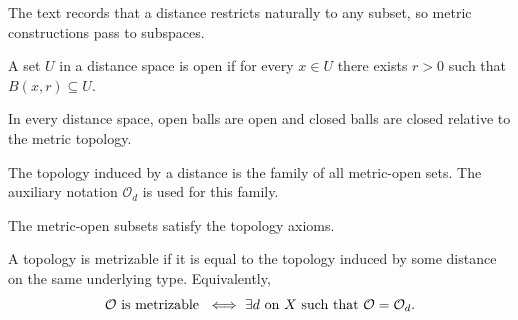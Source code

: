 \begin{remark}\label{rem:distance-restriction-1-13}
\leanok
The text records that a distance restricts naturally to any subset, so metric constructions pass to subspaces.
\end{remark}

\begin{definition}\label{def:is-open-distance-1-15}
\leanok
A set $U$ in a distance space is open if for every $x\in U$ there exists $r>0$ such that $B(x,r)\subseteq U$.
\end{definition}

\begin{proposition}\label{prop:balls-open-closed-1-16}
\leanok
In every distance space, open balls are open and closed balls are closed relative to the metric topology.
\end{proposition}

\begin{definition}\label{def:induced-topology-1-17}
\leanok
The topology induced by a distance is the family of all metric-open sets.
The auxiliary notation $\mathcal O_d$ is used for this family.
\end{definition}

\begin{proposition}\label{prop:induced-topology-is-topology-1-17}
\leanok
The metric-open subsets satisfy the topology axioms.
\end{proposition}

\begin{definition}\label{def:metrizable-1-18}
\leanok
A topology is metrizable if it is equal to the topology induced by some distance on the same underlying type.
Equivalently,
\[
\mathcal{O} \text{ is metrizable }
\iff
\exists d \text{ on } X \text{ such that } \mathcal{O} = \mathcal{O}_d.
\]
\end{definition}

